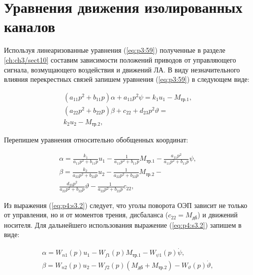 \section{Уравнения движения изолированных каналов} \label{ch:ch4/sect3}

Используя линеаризованные уравнения (\ref{eq:p3:59}) полученные в разделе \ref{ch:ch3/sect10} составим зависимости положений приводов от управляющего сигнала, возмущающего воздействия и движений ЛА. В виду незначительного влияния перекрестных связей запишем уравнения (\ref{eq:p3:59}) в следующем виде:

\begin{equation}
\label{eq:p4:s3.1}
\begin{multlined}
\left( a_{11}p^{2}+b_{11}p \right)  \alpha + 
a_{11} p^2  \psi 
=
k_{1}  u_{1}- 
 M_{\textit{тр.1}},\\
\left( a_{22}p^{2}+b_{22}p \right)  \beta + c_{22}+
d_{23} p^2  \vartheta
=\\
k_{2}  u_{2} - M_{\textit{тр.2}},
\end{multlined}
\end{equation}

Перепишем уравнения относительно обобщенных координат:

\begin{equation}
\label{eq:p4:s3.2}
\begin{multlined}
\alpha= 
\frac{k_{1}}{a_{11}p^{2}+b_{11}p} u_{1} - 
\frac{1}{a_{11}p^{2}+b_{11}p} M_{\textit{тр.1}} - 
\frac{a_{11} p^2}{a_{11}p^{2}+b_{11}p}  \psi  ,\\
\beta=
\frac{k_{2}}{a_{22}p^{2}+b_{22}p} u_{2} - 
\frac{1}{a_{22}p^{2}+b_{22}p} M_{\textit{тр.2}} - \\
\frac{d_{23} p^2}{a_{22}p^{2}+b_{22}p} \vartheta -
\frac{1}{a_{22}p^{2}+b_{22}p} c_{22},
\end{multlined}
\end{equation}

Из выражения (\ref{eq:p4:s3.2}) следует, что уголы поворота ОЭП зависит не только от управления, но и от моментов трения, дисбаланса ($c_{22}=M_{\textit{дб}}$) и движений носителя. Для дальнейшего использования выражение (\ref{eq:p4:s3.2}) запишем в виде:

\begin{equation}
\label{eq:p4:s3.3}
\begin{aligned}
\alpha= 
W_{n1}(p) u_{1} - 
W_{f1}(p) M_{\textit{тр.1}} - 
W_{\psi 1}(p) \dot \psi  ,\\
\beta=
W_{n2}(p) u_{2} - 
W_{f2}(p) (M_{\textit{дб}} + M_{\textit{тр.2}}) - 
W_{\vartheta}(p) \dot \vartheta,
\end{aligned}
\end{equation}

